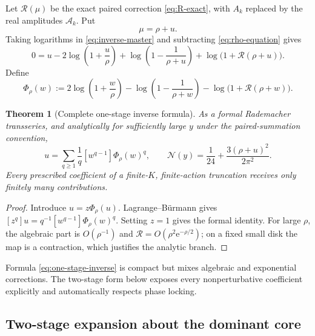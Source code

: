 \documentclass[11pt,a4paper]{article}
\numberwithin{equation}{section}
\newtheorem{theorem}{Theorem}[section]
\theoremstyle{definition}
\theoremstyle{remark}
\newcommand{\e}{\mathrm e}
\newcommand{\Acal}{\mathcal A}
\newcommand{\Ncal}{\mathcal N}
\newcommand{\Rcal}{\mathcal R}
\begin{document}
Let $\Rcal(\mu)$ be the exact paired correction \eqref{eq:R-exact}, with
$A_k$ replaced by the real amplitudes $\Acal_k$.  Put
\begin{equation}\label{eq:mu-rho-u}
 \mu=\rho+u.
\end{equation}
Taking logarithms in \eqref{eq:inverse-master} and subtracting
\eqref{eq:rho-equation} gives
\begin{equation}\label{eq:u-master}
 0=u-2\log\left(1+\frac u\rho\right)
 +\log\left(1-\frac1{\rho+u}\right)
 +\log\bigl(1+\Rcal(\rho+u)\bigr).
\end{equation}
Define
\begin{equation}\label{eq:Phi-rho}
 \Phi_\rho(w):=
 2\log\left(1+\frac w\rho\right)
 -\log\left(1-\frac1{\rho+w}\right)
 -\log\bigl(1+\Rcal(\rho+w)\bigr).
\end{equation}

\begin{theorem}[Complete one-stage inverse formula]\label{thm:one-stage-inverse}
As a formal Rademacher transseries, and analytically for sufficiently large
$y$ under the paired-summation convention,
\begin{equation}\label{eq:one-stage-inverse}
 \boxed{
 u=\sum_{q\geq1}\frac1q[w^{q-1}]\Phi_\rho(w)^q,\qquad
 \Ncal(y)=\frac1{24}+\frac{3(\rho+u)^2}{2\pi^2}.}
\end{equation}
Every prescribed coefficient of a finite-$K$, finite-action truncation receives
only finitely many contributions.
\end{theorem}

\begin{proof}
Introduce $u=z\Phi_\rho(u)$.  Lagrange--B\"urmann gives
$[z^q]u=q^{-1}[w^{q-1}]\Phi_\rho(w)^q$.  Setting $z=1$ gives the formal
identity.  For large $\rho$, the algebraic part is $O(\rho^{-1})$ and
$\Rcal=O(\rho^2\e^{-\rho/2})$; on a fixed small disk the map is a contraction,
which justifies the analytic branch.
\end{proof}

Formula \eqref{eq:one-stage-inverse} is compact but mixes algebraic and
exponential corrections.  The two-stage form below exposes every
nonperturbative coefficient explicitly and automatically respects phase
locking.

\subsection{Two-stage expansion about the dominant core}
\end{document}
